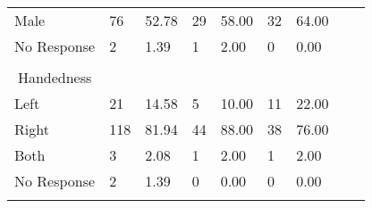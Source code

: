 \begin{appendix}
\begin{table}[htbp]
\begin{threeparttable}
\begin{tabular}{llccccccc}
\multicolumn{1}{l}{Male} & \multicolumn{1}{l}{76} & \multicolumn{1}{l}{52.78} & \multicolumn{1}{l}{29} & \multicolumn{1}{l}{58.00} & \multicolumn{1}{l}{32} & \multicolumn{1}{l}{64.00} \\
\multicolumn{1}{l}{No Response} & \multicolumn{1}{l}{2} & \multicolumn{1}{l}{ 1.39} & \multicolumn{1}{l}{1} & \multicolumn{1}{l}{ 2.00} & \multicolumn{1}{l}{0} & \multicolumn{1}{l}{ 0.00} \\
& & & & & & & \\
\multicolumn{1}{c}{Handedness} & & & & & & \\
\midrule
\multicolumn{1}{l}{Left} & \multicolumn{1}{l}{21} & \multicolumn{1}{l}{14.58} & \multicolumn{1}{l}{5} & \multicolumn{1}{l}{10.00} & \multicolumn{1}{l}{11} & \multicolumn{1}{l}{22.00} \\
\multicolumn{1}{l}{Right} & \multicolumn{1}{l}{118} & \multicolumn{1}{l}{81.94} & \multicolumn{1}{l}{44} & \multicolumn{1}{l}{88.00} & \multicolumn{1}{l}{38} & \multicolumn{1}{l}{76.00} \\
\multicolumn{1}{l}{Both} & \multicolumn{1}{l}{3} & \multicolumn{1}{l}{ 2.08} & \multicolumn{1}{l}{1} & \multicolumn{1}{l}{ 2.00} & \multicolumn{1}{l}{1} & \multicolumn{1}{l}{ 2.00} \\
\multicolumn{1}{l}{No Response} & \multicolumn{1}{l}{2} & \multicolumn{1}{l}{ 1.39} & \multicolumn{1}{l}{0} & \multicolumn{1}{l}{ 0.00} & \multicolumn{1}{l}{0} & \multicolumn{1}{l}{ 0.00} \\
 & & & & & \\
\bottomrule
\end{tabular}%
\end{threeparttable}
\end{table}
\end{appendix}
